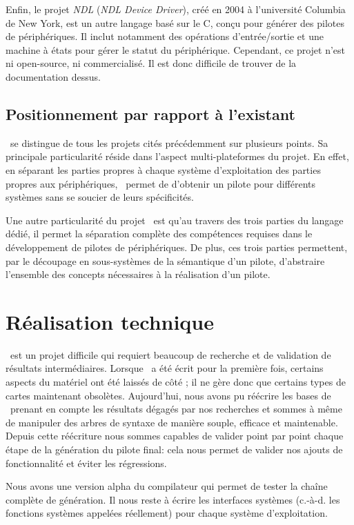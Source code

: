 \documentclass[francais]{rtxreport}
\begin{document}
Enfin, le projet \emph{NDL} (\emph{NDL Device Driver}), créé en 2004 à
l'université Columbia de New York, est un autre langage basé sur le C, conçu
pour générer des pilotes de périphériques. Il inclut notamment des opérations
d'entrée/sortie et une machine à états pour gérer le statut du
périphérique. Cependant, ce projet n'est ni open-source, ni commercialisé. Il
est donc difficile de trouver de la documentation dessus.

\section{Positionnement par rapport à l'existant}
\rtx\ se distingue de tous les projets cités précédemment sur plusieurs
points. Sa principale particularité réside dans l'aspect multi-plateformes du
projet. En effet, en séparant les parties propres à chaque système
d'exploitation des parties propres aux périphériques, \rtx\ permet de d'obtenir
un pilote pour différents systèmes sans se soucier de leurs spécificités.

Une autre particularité du projet \rtx\ est qu'au travers des trois parties du
langage dédié, il permet la séparation complète des compétences requises dans le
développement de pilotes de périphériques. De plus, ces trois parties
permettent, par le découpage en sous-systèmes de la sémantique d'un pilote,
d'abstraire l'ensemble des concepts nécessaires à la réalisation d'un pilote.

\chapter{Réalisation technique}

\rtx\ est un projet difficile qui requiert beaucoup de recherche et de
validation de résultats intermédiaires. Lorsque \rtx\ a été écrit pour la
première fois, certains aspects du matériel ont été laissés de côté ; il ne gère
donc que certains types de cartes maintenant obsolètes. Aujourd'hui, nous avons
pu réécrire les bases de \rtx\ prenant en compte les résultats dégagés par nos
recherches et sommes à même de manipuler des arbres de syntaxe de manière
souple, efficace et maintenable. Depuis cette réécriture nous sommes capables de
valider point par point chaque étape de la génération du pilote final: cela nous
permet de valider nos ajouts de fonctionnalité et éviter les régressions.

Nous avons une version alpha du compilateur qui permet de tester la chaîne
complète de génération. Il nous reste à écrire les interfaces systèmes (c.-à-d.
les fonctions systèmes appelées réellement) pour chaque système d’exploitation.
\end{document}
